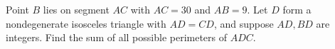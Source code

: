 Point $B$ lies on segment $AC$ with $AC=30$ and $AB=9$. Let $D$ form a nondegenerate isosceles triangle with $AD=CD$, and suppose $AD,BD$ are integers. Find the sum of all possible perimeters of $ADC$.
